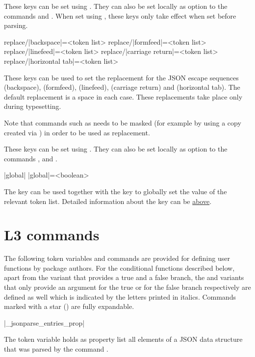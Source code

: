 \documentclass[a4paper]{article}
\begin{document}
{{These keys can be set using \macro{\JSONParseSet}. They can also be set locally as option to the commands \macro{\JSONParse} and \macro{\JSONParseFromFile}. When set using \macro{\JSONParseSet}, these keys only take effect when set before parsing.

\begin{macrodef}
replace/|backspace|={<token list>}
replace/|formfeed|={<token list>}
replace/|linefeed|={<token list>}
replace/|carriage return|={<token list>}
replace/|horizontal tab|={<token list>}
\end{macrodef}
These keys can be used to set the replacement for the JSON escape sequences \macro{\b} (backspace), \macro{\f} (formfeed), \macro{\n} (linefeed), \macro{\r} (carriage return) and \macro{\t} (horizontal tab). The default replacement is a space in each case. These replacements take place only during typesetting.

\warning Note that commands such as \macro{\par} needs to be masked (for example by using a copy created via \macro{\let}) in order to be used as replacement.

These keys can be set using \macro{\JSONParseSet}. They can also be set locally as option to the commands \macro{\JSONParseValue}, \macro{\JSONParseArrayUse} and \macro{\JSONParseArrayMapFunction}.

\begin{macrodef}
|global|
|global|={<boolean>}
\end{macrodef}
The key  can be used together with the key  to globally set the value of the relevant token list. Detailed information about the key  can be \hyperlink{key:storein}{above}.

\section{L3 commands}

The following token variables and commands are provided for defining user functions by package authors. For the conditional functions described below, apart from the variant that provides a true and a false branch, the and variants that only provide an argument for the true or for the false branch respectively are defined as well which is indicated by the letters {\itshape{}} printed in italics. Commands marked with a star (\expandablestar) are fully expandable.

\begin{macrodef}
|\g_jsonparse_entries_prop|
\end{macrodef}
The token variable  holds as property list all elements of a JSON data structure that was parsed by the command .

}}
\end{document}
